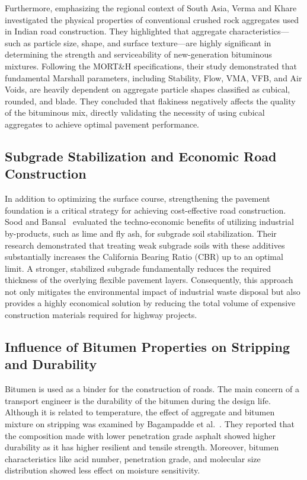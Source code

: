 \documentclass[12pt,a4paper]{article}
\begin{document}
Furthermore, emphasizing the regional context of South Asia, Verma and Khare~\cite{verma2024study} investigated the physical properties of conventional crushed rock aggregates used in Indian road construction. They highlighted that aggregate characteristics---such as particle size, shape, and surface texture---are highly significant in determining the strength and serviceability of new-generation bituminous mixtures. Following the MORT\&H specifications, their study demonstrated that fundamental Marshall parameters, including Stability, Flow, VMA, VFB, and Air Voids, are heavily dependent on aggregate particle shapes classified as cubical, rounded, and blade. They concluded that flakiness negatively affects the quality of the bituminous mix, directly validating the necessity of using cubical aggregates to achieve optimal pavement performance.

\subsection{Subgrade Stabilization and Economic Road Construction}
In addition to optimizing the surface course, strengthening the pavement foundation is a critical strategy for achieving cost-effective road construction. Sood and Bansal~\cite{sood2015evaluation} evaluated the techno-economic benefits of utilizing industrial by-products, such as lime and fly ash, for subgrade soil stabilization. Their research demonstrated that treating weak subgrade soils with these additives substantially increases the California Bearing Ratio (CBR) up to an optimal limit. A stronger, stabilized subgrade fundamentally reduces the required thickness of the overlying flexible pavement layers. Consequently, this approach not only mitigates the environmental impact of industrial waste disposal but also provides a highly economical solution by reducing the total volume of expensive construction materials required for highway projects.

\subsection{Influence of Bitumen Properties on Stripping and Durability}
Bitumen is used as a binder for the construction of roads. The main concern of a transport engineer is the durability of the bitumen during the design life. Although it is related to temperature, the effect of aggregate and bitumen mixture on stripping was examined by Bagampadde et al.~\cite{bagampadde2006impact}. They reported that the composition made with lower penetration grade asphalt showed higher durability as it has higher resilient and tensile strength. Moreover, bitumen characteristics like acid number, penetration grade, and molecular size distribution showed less effect on moisture sensitivity.
\end{document}
